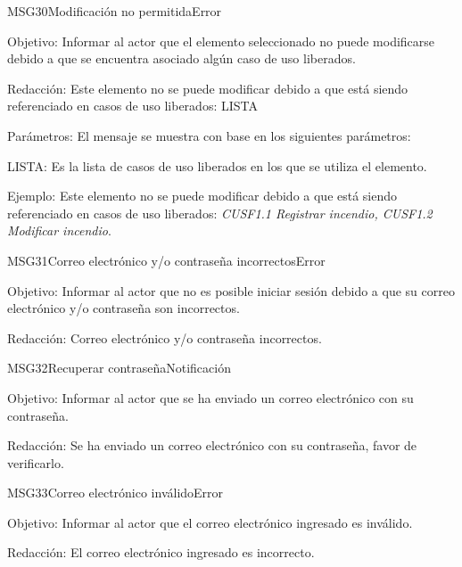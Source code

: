 \begin{mensaje}{MSG30}{Modificación no permitida}{Error}
    \item[Objetivo:] Informar al actor que el elemento seleccionado no puede modificarse debido a que se encuentra asociado algún caso de uso liberados.
    \item[Redacción:] Este elemento no se puede modificar debido a que está siendo referenciado en casos de uso liberados: LISTA
    \item[Parámetros:] El mensaje se muestra con base en los siguientes parámetros:
    \begin{Citemize}
	\item LISTA: Es la lista de casos de uso liberados en los que se utiliza el elemento.
    \end{Citemize}
    \item[Ejemplo:] Este elemento no se puede modificar debido a que está siendo referenciado en casos de uso liberados: {\em CUSF1.1 Registrar incendio, CUSF1.2 Modificar incendio}.
\end{mensaje}
\begin{mensaje}{MSG31}{Correo electrónico y/o contraseña incorrectos}{Error}
    \item[Objetivo:] Informar al actor que no es posible iniciar sesión debido a que su correo electrónico y/o contraseña son incorrectos.
    \item[Redacción:] Correo electrónico y/o contraseña incorrectos.
\end{mensaje}

\begin{mensaje}{MSG32}{Recuperar contraseña}{Notificación}
    \item[Objetivo:] Informar al actor que se ha enviado un correo electrónico con su contraseña.
    \item[Redacción:] Se ha enviado un correo electrónico con su contraseña, favor de verificarlo.
\end{mensaje}
\begin{mensaje}{MSG33}{Correo electrónico inválido}{Error}
    \item[Objetivo:] Informar al actor que el correo electrónico ingresado es inválido.
    \item[Redacción:] El correo electrónico ingresado es incorrecto.
\end{mensaje}

